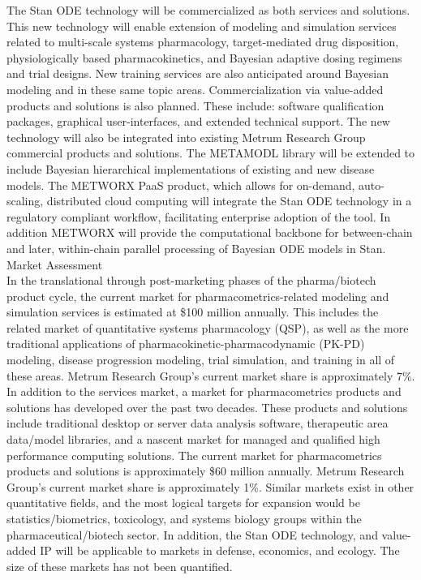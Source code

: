 \documentclass[11pt]{nih2016}
\begin{document}
\noindent
The Stan ODE technology will be commercialized as both services and
solutions. This new technology will enable extension of modeling and
simulation services related to multi-scale systems pharmacology,
target-mediated drug disposition, physiologically based
pharmacokinetics, and Bayesian adaptive dosing regimens and trial
designs. New training services are also anticipated around Bayesian
modeling and in these same topic areas. Commercialization via
value-added products and solutions is also planned. These include:
software qualification packages, graphical user-interfaces, and
extended technical support. The new technology will also be integrated
into existing Metrum Research Group commercial products and
solutions. The METAMODL library will be extended to include Bayesian
hierarchical implementations of existing and new disease models. The
METWORX PaaS product, which allows for on-demand, auto-scaling,
distributed cloud computing will integrate the Stan ODE technology in
a regulatory compliant workflow, facilitating enterprise adoption of
the tool. In addition METWORX will provide the computational backbone
for between-chain and later, within-chain parallel processing of
Bayesian ODE models in Stan.\\ 

\noindent
{\sc Market Assessment}
\\[2pt]
In the translational through post-marketing phases of the
pharma/biotech product cycle, the current market for
pharmacometrics-related modeling and simulation services is estimated
at \$100 million annually. This includes the related market of
quantitative systems pharmacology (QSP), as well as the more
traditional applications of pharmacokinetic-pharmacodynamic (PK-PD)
modeling, disease progression modeling, trial simulation, and training
in all of these areas. Metrum Research Group's current market share is
approximately 7\%. In addition to the services market, a market for
pharmacometrics products and solutions has developed over the past two
decades. These products and solutions include traditional desktop or
server data analysis software, therapeutic area data/model libraries,
and a nascent market for managed and qualified high performance
computing solutions.  The current market for pharmacometrics products
and solutions is approximately \$60 million annually. Metrum Research
Group's current market share is approximately 1\%. Similar markets
exist in other quantitative fields, and the most logical targets for
expansion would be statistics/biometrics, toxicology, and systems
biology groups within the pharmaceutical/biotech sector. In addition,
the Stan ODE technology, and value-added IP will be applicable to
markets in defense, economics, and ecology. The size of these markets
has not been quantified. \\ 
\end{document}
